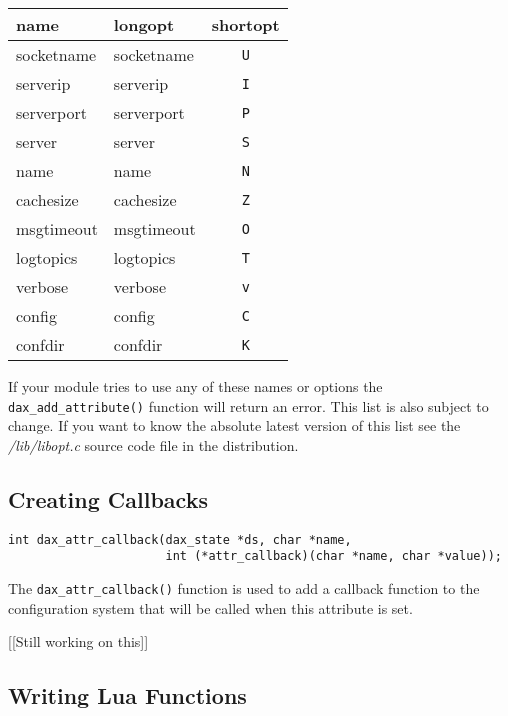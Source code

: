 \begin{tabular}{|l|l|c|}
\hline \textbf{name} & \textbf{longopt} & \textbf{shortopt} \\
\hline socketname & socketname & \texttt{U} \\
\hline serverip & serverip & \texttt{I} \\
\hline serverport & serverport & \texttt{P} \\
\hline server & server & \texttt{S} \\
\hline name & name & \texttt{N} \\
\hline cachesize & cachesize & \texttt{Z} \\
\hline msgtimeout & msgtimeout & \texttt{O} \\
\hline logtopics\footnotemark & logtopics & \texttt{T} \\
\hline verbose\footnotemark[\value{footnote}] & verbose & \texttt{v} \\
\hline config\footnotemark[\value{footnote}] & config & \texttt{C} \\
\hline confdir\footnotemark[\value{footnote}] & confdir & \texttt{K} \\
\hline
\end{tabular}

If your module tries to use any of these names or options the
\verb|dax_add_attribute()| function will return an error.  This list is also
subject to change.  If you want to know the absolute latest version of this list
see the \textit{/lib/libopt.c} source code file in the \opendax distribution.

\subsection{Creating Callbacks}
\begin{verbatim}
int dax_attr_callback(dax_state *ds, char *name,
                      int (*attr_callback)(char *name, char *value));
\end{verbatim}

The \verb|dax_attr_callback()| function is
used to add a callback function to the configuration system that will be called
when this attribute is set.

[[Still working on this]]

\subsection{Writing Lua Functions}

